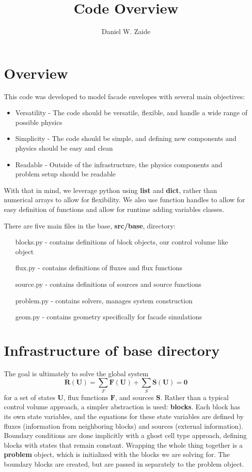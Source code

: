 \documentclass[11pt]{article}
\title{Code Overview}
\author{Daniel W. Zaide}
\begin{document}
\maketitle

\section{Overview}

This code was developed to model facade envelopes with several main objectives:
\begin{itemize}
\item Versatility - The code should be versatile, flexible, and handle a wide range of possible physics
\item Simplicity - The code should be simple, and defining new components and physics should be easy and clean
\item Readable - Outside of the infrastructure, the physics components and problem setup should be readable
\end{itemize}

With that in mind, we leverage python using {\bf list} and {\bf dict}, rather than numerical arrays to allow for flexibility. We also use function handles to allow for easy definition of functions and allow for runtime adding variables classes.

There are five main files in the base, {\bf src/base}, directory:
\begin{itemize}
\item [blocks.py] - contains definitions of block objects, our control volume like object
\item [flux.py] - contains definitions of fluxes and flux functions
\item [source.py] - contains definitions of sources and source functions
\item [problem.py] - contains solvers, manages system construction
\item [geom.py] - contains geometry specifically for facade simulations
\end{itemize}
\section{Infrastructure of base directory}
The goal is ultimately to solve the global system
\begin{equation}
\mathbf{R}(\mathbf{U}) = \sum_F \mathbf{F}(\mathbf{U}) + \sum_S \mathbf{S}(\mathbf{U}) = \mathbf{0}
\end{equation}
for a set of states $\mathbf{U}$, flux functions $\mathbf{F}$, and sources $\mathbf{S}$. Rather than a typical control volume approach, a simpler abstraction is used: {\bf blocks}. Each block has its own state variables, and the equations for these state variables are defined by fluxes (information from neighboring blocks) and sources (external information). Boundary conditions are done implicitly with a ghost cell type approach, defining blocks with states that remain constant. Wrapping the whole thing together is a {\bf problem} object, which is initialized with the blocks we are solving for. The boundary blocks are created, but are passed in separately to the problem object.
\end{document}
